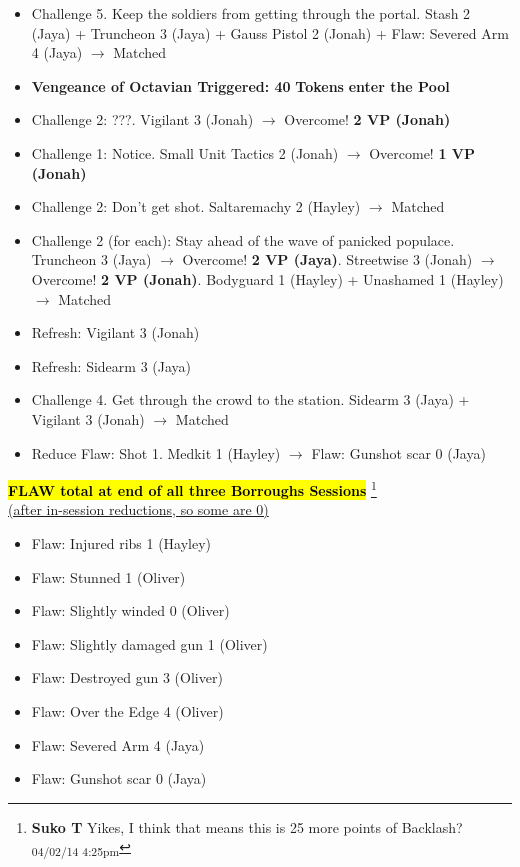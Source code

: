 \begin{itemize}
\item Challenge 5.  Keep the soldiers from getting through the portal.  Stash 2 (Jaya) + Truncheon 3 (Jaya) + Gauss Pistol 2 (Jonah) +  {\color[RGB]{255,0,0}Flaw: Severed Arm 4 (Jaya)}  $\rightarrow$ Matched
\item \textbf{Vengeance of Octavian Triggered: 40}\textbf{ Tokens}\textbf{ enter the Pool}
\item Challenge 2: ???.  Vigilant 3 (Jonah)  $\rightarrow$ Overcome! \textbf{2 VP (Jonah)}
\item Challenge 1: Notice.  Small Unit Tactics 2 (Jonah)  $\rightarrow$ Overcome! \textbf{1 VP (Jonah)}
\item Challenge 2: Don't get shot.  Saltaremachy 2 (Hayley) $\rightarrow$ Matched
\item Challenge 2 (for each): Stay ahead of the wave of panicked populace.   Truncheon 3 (Jaya)  $\rightarrow$ Overcome! \textbf{2 VP (Jaya)}.  Streetwise 3  (Jonah) $\rightarrow$ Overcome! \textbf{2 VP (Jonah)}. Bodyguard 1 (Hayley) + Unashamed 1 (Hayley)  $\rightarrow$ Matched
\item Refresh: Vigilant 3 (Jonah)
\item Refresh: Sidearm 3 (Jaya)
\item Challenge 4.  Get through the crowd to the station.  Sidearm 3 (Jaya) + Vigilant 3 (Jonah)  $\rightarrow$ Matched
\item Reduce Flaw: Shot 1.  Medkit 1 (Hayley) $\rightarrow$   {\color[RGB]{255,0,0}Flaw: Gunshot scar 0 (Jaya)} 
\end{itemize}




\textbf{\hl{FLAW total at end of all three Borroughs Sessions} }\footnote{\textbf{Suko T }Yikes, I think that means this is 25 more points of Backlash? \textsubscript{04/02/14 4:25pm}}\\
\underline{   (after in-session reductions, so some are 0) }

\begin{itemize}
\item  {\color[RGB]{255,0,0}Flaw: Injured ribs 1 (Hayley)} 
\item  {\color[RGB]{255,0,0}Flaw: Stunned 1 (Oliver)} 
\item  {\color[RGB]{255,0,0}Flaw: Slightly winded 0 (Oliver)} 
\item  {\color[RGB]{255,0,0}Flaw: Slightly damaged gun 1 (Oliver)} 
\item  {\color[RGB]{255,0,0}Flaw: Destroyed gun 3 (Oliver)} 
\item  {\color[RGB]{255,0,0}Flaw: Over the Edge 4 (Oliver)} 
\item  {\color[RGB]{255,0,0}Flaw: Severed Arm 4 (Jaya)} 
\item  {\color[RGB]{255,0,0}Flaw: Gunshot scar 0 (Jaya)} 
\end{itemize}





